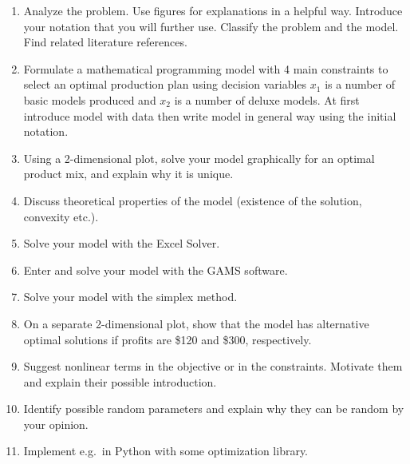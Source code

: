 \documentclass[../bakalarka-main.tex]{subfiles}
\begin{document}
	\begin{enumerate}
		\item Analyze the problem. Use figures for explanations in a helpful way. 
		Introduce your notation that you will further use. Classify the problem and the model. 
		Find related literature references.
		
		\item Formulate a mathematical programming model with 4 main constraints to select an optimal production plan using decision variables 
		$x_1$ is a number of basic models produced and $x_2$ is a number of deluxe models. 
		At first introduce model with data then write model in general way using the initial notation.
		
		\item Using a 2-dimensional plot, solve your model graphically for an optimal product mix, and explain why it is unique.
		
		\item Discuss theoretical properties of the model (existence of the solution, convexity etc.).
		
		\item Solve your model with the Excel Solver.
		
		\item Enter and solve your model with the GAMS software.
		
		\item Solve your model with the simplex method.
		
		\item On a separate 2-dimensional plot, show that the model has alternative optimal solutions if profits are \$120 and \$300, respectively.
		
		\item Suggest nonlinear terms in the objective or in the constraints. Motivate them and explain their possible introduction.
		
		\item Identify possible random parameters and explain why they can be random by your opinion.
		
		\item Implement e.g.\ in Python with some optimization library.
	\end{enumerate}
	
	\vfill
	
\end{document}
